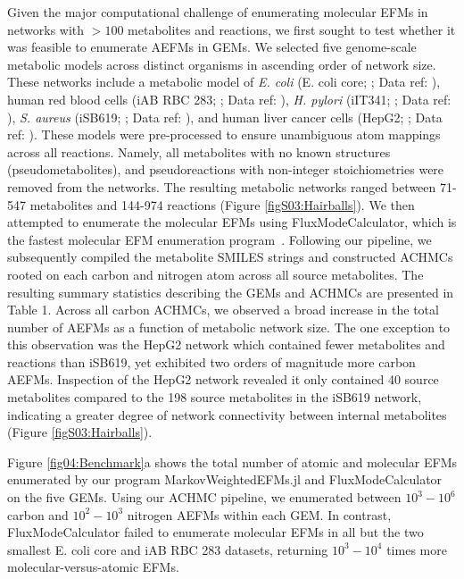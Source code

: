 \documentclass[12pt]{article}
\begin{document}
Given the major computational challenge of enumerating molecular EFMs in
networks with $>100$ metabolites and reactions, we first sought to test
whether it was feasible to enumerate AEFMs in GEMs. We selected five
genome-scale metabolic models across distinct organisms in ascending order
of network size. These networks include a metabolic model of \textit{E.
coli} (E. coli core; \citealt{OrthJeffreyD2010RaUo}; Data ref:
\citealt{OrthJeffreyD2010RaUoDATASET}), human red blood cells (iAB RBC
283; \citealt{BordbarAarash2011iApd}; Data ref:
\citealt{BordbarAarash2011iApdDATASET}), \textit{H. pylori} (iIT341;
\citealt{ThieleInes2005EMRo}; Data ref:
\citealt{ThieleInes2005EMRoDATASET}), \textit{S. aureus} (iSB619;
\citealt{BeckerScottA2005Grot}; Data ref:
\citealt{BeckerScottA2005GrotDATASET}), and human liver cancer cells
(HepG2; \citealt{NilssonAvlant2020Qaoa}; Data ref:
\citealt{NilssonAvlant2020QaoaDATASET}). These models were pre-processed
to ensure unambiguous atom mappings across all reactions. Namely, all
metabolites with no known structures (pseudometabolites), and
pseudoreactions with non-integer stoichiometries were removed from the
networks. The resulting metabolic networks ranged between 71-547
metabolites and 144-974 reactions (Figure \ref{figS03:Hairballs}). We then
attempted to enumerate the molecular EFMs using FluxModeCalculator, which
is the fastest molecular EFM enumeration
program~\citep{vanKlinkenJanBert2016Faet}. Following our pipeline, we
subsequently compiled the metabolite SMILES strings and constructed ACHMCs
rooted on each carbon and nitrogen atom across all source metabolites. The
resulting summary statistics describing the GEMs and ACHMCs are presented
in Table 1. Across all carbon ACHMCs, we observed a broad increase in the
total number of AEFMs as a function of metabolic network size. The one
exception to this observation was the HepG2 network which contained fewer
metabolites and reactions than iSB619, yet exhibited two orders of
magnitude more carbon AEFMs. Inspection of the HepG2 network revealed it
only contained 40 source metabolites compared to the 198 source
metabolites in the iSB619 network, indicating a greater degree of network
connectivity between internal metabolites (Figure \ref{figS03:Hairballs}).

Figure \ref{fig04:Benchmark}a shows the total number of atomic and
molecular EFMs enumerated by our program MarkovWeightedEFMs.jl and
FluxModeCalculator on the five GEMs. Using our ACHMC pipeline, we
enumerated between $10^3 - 10^6$ carbon and $10^2-10^3$ nitrogen AEFMs
within each GEM. In contrast, FluxModeCalculator failed to enumerate
molecular EFMs in all but the two smallest E. coli core and iAB RBC 283
datasets, returning $10^3 - 10^4$ times more molecular-versus-atomic EFMs. 
\end{document}
